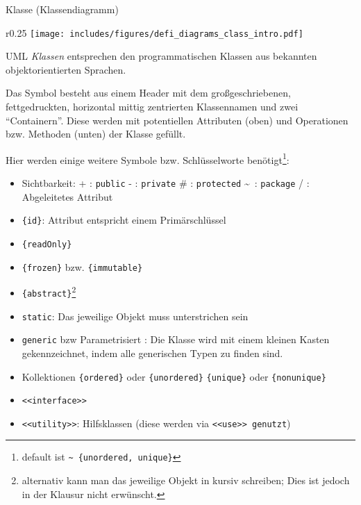 
\begin{diag}{Klasse (Klassendiagramm)}
    \begin{wrapfigure}{r}{0.25\textwidth}
        \centering
        \texttt{[image: includes/figures/defi\_diagrams\_class\_intro.pdf]}
    \end{wrapfigure}
    UML \emph{Klassen} entsprechen den programmatischen Klassen aus bekannten objektorientierten Sprachen.

    Das Symbol besteht aus einem Header mit dem großgeschriebenen, fettgedruckten, horizontal mittig zentrierten Klassennamen und zwei \enquote{Containern}.
    Diese werden mit potentiellen Attributen (oben) und Operationen bzw. Methoden (unten) der Klasse gefüllt.

    Hier werden einige weitere Symbole bzw. Schlüsselworte benötigt\footnote{default ist \texttt{\textasciitilde \ \{unordered, unique\}}}:
    \begin{itemize}
        \item Sichtbarkeit:
              \subitem + : \texttt{public}
              \subitem - : \texttt{private}
              \subitem \# : \texttt{protected}
              \subitem \textasciitilde\ : \texttt{package}
              \subitem / : Abgeleitetes Attribut
        \item \texttt{\{id\}}: Attribut entspricht einem Primärschlüssel
        \item \texttt{\{readOnly\}}
        \item \texttt{\{frozen\}} bzw. \texttt{\{immutable\}}
        \item \texttt{\{abstract\}}\footnote{alternativ kann man das jeweilige Objekt in kursiv schreiben; Dies ist jedoch in der Klausur nicht erwünscht.}
        \item \texttt{static}: Das jeweilige Objekt muss unterstrichen sein
        \item \texttt{generic} bzw Parametrisiert : Die Klasse wird mit einem kleinen Kasten gekennzeichnet, indem alle generischen Typen zu finden sind.
        \item Kollektionen
              \subitem \texttt{\{ordered\}} oder \texttt{\{unordered\}}
              \subitem \texttt{\{unique\}} oder \texttt{\{nonunique\}}
        \item \texttt{<<interface>>}
        \item \texttt{<<utility>>}: Hilfsklassen (diese werden via \texttt{<<use>> genutzt})
    \end{itemize}
\end{diag}

